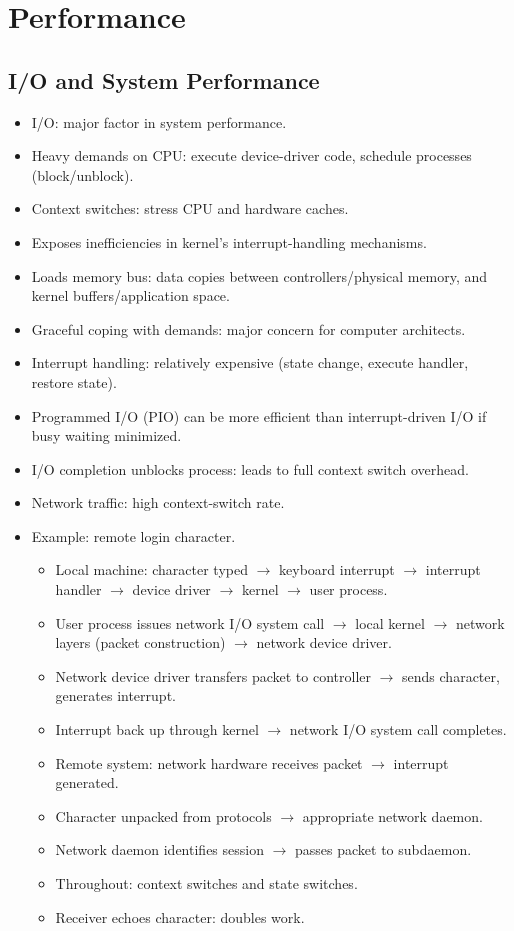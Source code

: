 \section{Performance}

\subsection{I/O and System Performance}
\begin{itemize}
    \item I/O: major factor in system performance.
    \item Heavy demands on CPU: execute device-driver code, schedule processes (block/unblock).
    \item Context switches: stress CPU and hardware caches.
    \item Exposes inefficiencies in kernel's interrupt-handling mechanisms.
    \item Loads memory bus: data copies between controllers/physical memory, and kernel buffers/application space.
    \item Graceful coping with demands: major concern for computer architects.
    \item Interrupt handling: relatively expensive (state change, execute handler, restore state).
    \item Programmed I/O (PIO) can be more efficient than interrupt-driven I/O if busy waiting minimized.
    \item I/O completion unblocks process: leads to full context switch overhead.
    \item Network traffic: high context-switch rate.
    \item Example: remote login character.
    \begin{itemize}
        \item Local machine: character typed $\rightarrow$ keyboard interrupt $\rightarrow$ interrupt handler $\rightarrow$ device driver $\rightarrow$ kernel $\rightarrow$ user process.
        \item User process issues network I/O system call $\rightarrow$ local kernel $\rightarrow$ network layers (packet construction) $\rightarrow$ network device driver.
        \item Network device driver transfers packet to controller $\rightarrow$ sends character, generates interrupt.
        \item Interrupt back up through kernel $\rightarrow$ network I/O system call completes.
        \item Remote system: network hardware receives packet $\rightarrow$ interrupt generated.
        \item Character unpacked from protocols $\rightarrow$ appropriate network daemon.
        \item Network daemon identifies session $\rightarrow$ passes packet to subdaemon.
        \item Throughout: context switches and state switches.
        \item Receiver echoes character: doubles work.
    \end{itemize}
\end{itemize}

